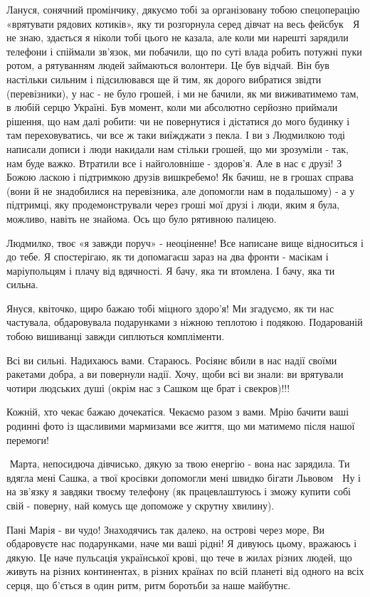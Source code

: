 Лануся, сонячний промінчику, дякуємо тобі за організовану тобою спецоперацію
«врятувати  рядових котиків», яку ти розгорнула серед дівчат на весь фейсбук 🙂
Я не знаю, здається я ніколи тобі цього не казала, але коли ми нарешті зарядили
телефони і спіймали зв’язок, ми побачили, що по суті влада робить потужні пуки
ротом, а рятуванням людей займаються волонтери. Це був відчай. Він був
настільки сильним і підсилювався ще й тим, як дорого вибратися звідти
(перевізники), у нас - не було грошей, і ми не бачили, як ми виживатимемо там,
в любій серцю Україні. Був момент, коли ми абсолютно серйозно приймали рішення,
що нам далі робити: чи не повернутися і дістатися до мого будинку і там
переховуватись, чи все ж таки виїжджати з пекла. І ви з Людмилкою тоді написали
дописи і люди накидали нам стільки грошей, що ми зрозуміли - так, нам буде
важко. Втратили все і найголовніше - здоров’я. Але в нас є друзі! З Божою
ласкою і підтримкою друзів вишкребемо! Як бачиш, не в грошах справа (вони й не
знадобилися на перевізника, але допомогли нам в подальшому) - а у підтримці,
яку продемонстрували через гроші мої друзі і люди, яким я була, можливо, навіть
не знайома. Ось що було рятивною палицею.

Людмилко, твоє «я завжди поруч» - неоціненне! Все написане вище відноситься і
до тебе. Я спостерігаю, як ти допомагаєш зараз на два фронти - масікам і
маріупольцям і плачу від вдячності. Я бачу, яка ти втомлена. І бачу, яка ти
сильна.

Януся, квіточко, щиро бажаю тобі міцного здоро’я! Ми згадуємо, як ти нас
частувала, обдаровувала подарунками з ніжною теплотою і подякою. Подарованій
тобою вишиванці завжди сиплються компліменти.

Всі ви сильні. Надихаюсь вами. Стараюсь. Росіянє вбили в нас надії своїми
ракетами добра, а ви повернули надії. Хочу, щоби всі ви знали: ви врятували
чотири людських душі (окрім нас з Сашком ще брат і свекров)!!!

Кожній, хто чекає бажаю дочекатіся. Чекаємо разом з вами. Мрію бачити ваші
родинні фото із щасливими мармизами все життя, що ми матимемо після нашої
перемоги!

 Марта, непосидюча дівчисько, дякую за твою енергію - вона нас зарядила. Ти
вдягла мені Сашка, а твої кросівки допомогли мені швидко бігати Львовом 🙂 Ну і
на зв’язку я завдяки твоєму телефону (як працевлаштуюсь і зможу купити собі
свій - поверну, най комусь ще допоможе у скрутну хвилину).

Пані Марія - ви чудо! Знаходячись так далеко, на острові через море, Ви
обдаровуєте нас подарунками, наче ми ваші рідні! Я дивуюсь цьому, вражаюсь і
дякую. Це наче пульсація української крові, що тече в жилах різних людей, що
живуть на різних континентах, в різних країнах по всій планеті від одного на
всіх серця, що б’ється в один ритм, ритм боротьби за наше майбутнє. 

